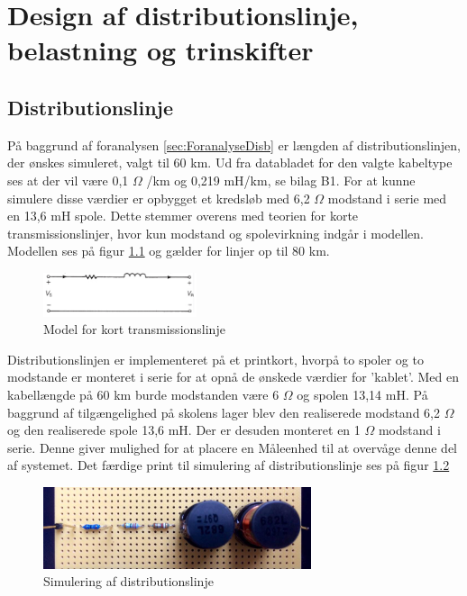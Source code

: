 
\chapter{Design af distributionslinje, belastning og trinskifter}

\section{Distributionslinje}
På baggrund af foranalysen \ref{sec:ForanalyseDisb} er længden af distributionslinjen, der ønskes simuleret, valgt til 60 km. Ud fra databladet for den valgte kabeltype ses at der  vil være 0,1 $\Omega$ /km og 0,219 mH/km, se bilag B1. For at kunne simulere disse værdier er opbygget et kredsløb med 6,2 $\Omega$ modstand i serie med en 13,6 mH spole. Dette stemmer overens med teorien for korte transmissionslinjer, hvor kun modstand og spolevirkning indgår i modellen. Modellen ses på figur \ref{fig:Kortlinjemodel} og gælder for linjer op til 80 km.

\begin{figure}[htbp] %
	\centering
	\includegraphics[width=0.4\textwidth]{Figure/Kortlinjemodel2}
	\caption{Model for kort transmissionslinje}
	\label{fig:Kortlinjemodel}
\end{figure}


Distributionslinjen er implementeret på et printkort, hvorpå to spoler og to modstande er monteret i serie for at opnå de ønskede værdier for 'kablet'. Med en kabellængde på 60 km burde modstanden være 6 $\Omega$ og spolen 13,14 mH. På baggrund af tilgængelighed på skolens lager blev den realiserede modstand 6,2 $\Omega$ og den realiserede spole 13,6 mH. Der er desuden monteret en 1 $\Omega$ modstand i serie. Denne giver mulighed for at placere en Måleenhed til at overvåge denne del af systemet. Det færdige print til simulering af distributionslinje ses på figur \ref{fig:Disblinje}

\begin{figure}[H] 
	\centering
	\includegraphics[width=0.7\textwidth]{Figure/Distributionslinje}
	\caption{Simulering af distributionslinje}
	\label{fig:Disblinje}
\end{figure}
